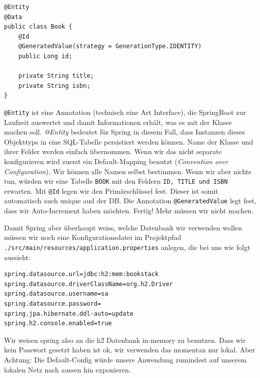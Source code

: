 \begin{listing}[H]
\begin{verbatim}
@Entity
@Data
public class Book {
    @Id
    @GeneratedValue(strategy = GenerationType.IDENTITY)
    public Long id;

    private String title;
    private String isbn;
}
\end{verbatim}
\caption{Book - Eine Entity-Klasse}
\label{lst:BookClass}
\end{listing}

\texttt{@Entity} ist eine Annotation (technisch eine Art Interface), die
SpringBoot zur Laufzeit auswertet und damit Informationen erhält, was
es mit der Klasse machen soll. \textit{@Entity} bedeutet für Spring
in diesem Fall, dass Instanzen dieses Objekttyps in eine SQL-Tabelle
persistiert werden können. Name der Klasse und ihrer Felder werden
einfach übernommen. Wenn wir das nicht separate konfigurieren 
wird zuerst ein Default-Mapping benutzt 
(\textit{Convention over Configuration}). Wir können alle Namen selbst
bestimmen. Wenn wir aber nichts tun, würden wir eine Tabelle 
\texttt{BOOK} mit den Feldern \texttt{ID, TITLE und ISBN} erwarten.
Mit \texttt{@Id} legen wir den Primärschlüssel fest. Dieser ist somit
automatisch auch unique aud der DB. Die Annotation 
\texttt{@GeneratedValue} legt fest, dass wir Auto-Increment haben möchten.
Fertig! Mehr müssen wir nicht machen.

Damit Spring aber überhaupt weiss, welche Datenbank wir verwenden wollen
müssen wir noch eine Konfigurationsdatei im Projektpfad
\texttt{./src/main/resources/application.properties} anlegen, die
bei uns wie folgt aussieht:

\begin{listing}[H]
\begin{verbatim}
spring.datasource.url=jdbc:h2:mem:bookstack
spring.datasource.driverClassName=org.h2.Driver
spring.datasource.username=sa
spring.datasource.password=
spring.jpa.hibernate.ddl-auto=update
spring.h2.console.enabled=true
\end{verbatim}
\caption{Konfiguration über application.properties}
\label{lst:BookClass}
\end{listing}

Wir weisen spring also an die h2 Datenbank in-memory zu
benutzen. Dass wir kein Passwort gesetzt haben ist ok,
wir verwenden das momentan nur lokal. Aber Achtung: 
Die Default-Config würde unsere Anwendung zumindest auf
unserem lokalen Netz nach aussen hin exponieren.

